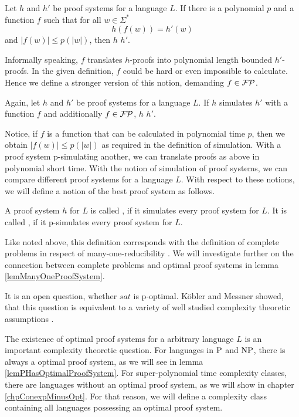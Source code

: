   \begin{definition}
    Let \(h\) and \(h'\) be proof systems for a language \(L\). If there is a polynomial \(p\) and a function \(f\) such that for all \(w \in \Sigma^*\)
      \[
        h(f(w)) = h'(w)
      \]
    and \(|f(w)| \leq p(|w|)\), then \(h\)  \(h'\).
  \end{definition}

  Informally speaking, \(f\) translates \(h\)-proofs into polynomial length bounded \(h'\)-proofs. In the given definition, \(f\) could be hard or even impossible to calculate. Hence we define a stronger version of this notion, demanding \(f \in \FP\).

  \begin{definition}
   Again, let \(h\) and \(h'\) be proof systems for a language \(L\). If \(h\) simulates \(h'\) with a function \(f\) and additionally \(f \in \FP\), \(h\)  \(h'\).
  \end{definition}

  Notice, if \(f\) is a function that can be calculated in polynomial time \(p\), then we obtain \(|f(w)| \leq p(|w|)\) as required in the definition of simulation. With a proof system p-simulating another, we can translate proofs as above in polynomial short time. With the notion of simulation of proof systems, we can compare different proof systems for a language \(L\). With respect to these notions, we will define a notion of the best proof system as follows.

  \begin{definition}
    A proof system \(h\) for \(L\) is called , if it simulates every proof system for \(L\). It is called , if it p-simulates every proof system for \(L\).
  \end{definition}

  Like noted above, this definition corresponds with the definition of complete problems in respect of many-one-reducibility \cite{KMT03}. We will investigate further on the connection between complete problems and optimal proof systems in lemma \ref{lemManyOneProofSystem}.
   
  It is an open question, whether \(sat\) is p-optimal. Köbler and Messner showed, that this question is equivalent to a variety of well studied complexity theoretic assumptions \cite{KM00}.

  The existence of optimal proof systems for a arbitrary language \(L\) is an important complexity theoretic question. For languages in \(\P\) and \(\NP\), there is always a optimal proof system, as we will see in lemma \ref{lemPHasOptimalProofSystem}. For super-polynomial time complexity classes, there are languages without an optimal proof system, as we will show in chapter \ref{chpConexpMinusOpt}. For that reason, we will define a complexity class containing all languages possessing an optimal proof system.

